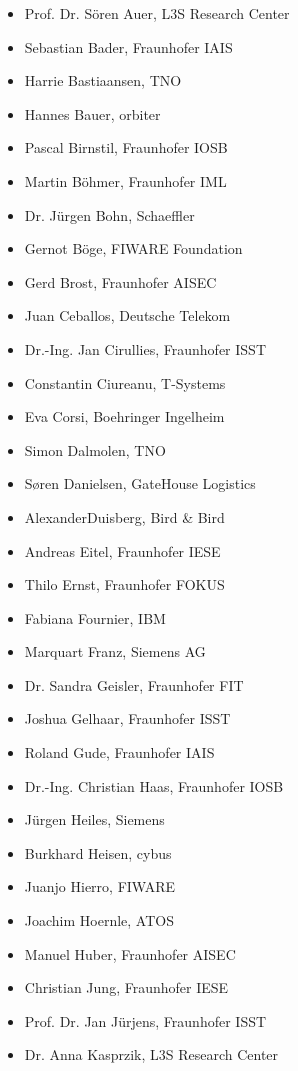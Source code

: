 \vspace{\baselineskip}
\begin{multicols}{2}
\begin{itemize}
	\item Prof. Dr. Sören Auer, L3S Research Center
	\item Sebastian Bader, Fraunhofer IAIS
	\item Harrie Bastiaansen, TNO
	\item Hannes Bauer, orbiter
	\item Pascal Birnstil, Fraunhofer IOSB
	\item Martin Böhmer, Fraunhofer IML
	\item 	Dr. Jürgen Bohn, Schaeffler
	\item 	Gernot Böge, FIWARE Foundation
	\item 	Gerd Brost, Fraunhofer AISEC
	\item 	Juan Ceballos, Deutsche Telekom
	\item 	Dr.-Ing. Jan Cirullies, Fraunhofer ISST
	\item 	Constantin Ciureanu, T-Systems
	\item 	Eva Corsi, Boehringer Ingelheim
	\item 	Simon Dalmolen, TNO
	\item 	Søren Danielsen, GateHouse Logistics
	\item 	AlexanderDuisberg, Bird \& Bird
	\item 	Andreas Eitel, Fraunhofer IESE
	\item 	Thilo Ernst, Fraunhofer FOKUS
	\item 	Fabiana Fournier, IBM
	\item 	Marquart Franz, Siemens AG
	\item 	Dr. Sandra Geisler, Fraunhofer FIT
	\item 	Joshua Gelhaar, Fraunhofer ISST
	\item 	Roland Gude, Fraunhofer IAIS
	\item 	Dr.-Ing. Christian Haas, Fraunhofer IOSB
	\item 	Jürgen Heiles, Siemens
	\item 	 Burkhard Heisen, cybus
	\item 	Juanjo Hierro, FIWARE
	\item 	Joachim Hoernle, ATOS
	\item 	Manuel Huber, Fraunhofer AISEC
	\item 	Christian Jung, Fraunhofer IESE
	\item 	Prof. Dr. Jan Jürjens, Fraunhofer ISST
	\item 	Dr. Anna Kasprzik, L3S Research Center

\end{itemize}
\end{multicols}
